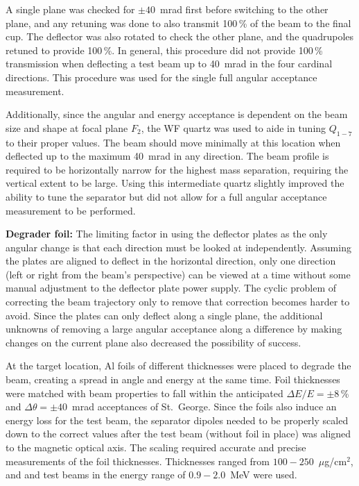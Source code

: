 A single plane was checked for $\pm 40$~mrad first before switching to
the other plane, and any retuning was done to also transmit 100\,\% of
the beam to the final cup. The deflector was also rotated to check the
other plane, and the quadrupoles retuned to provide 100\,\%. In general,
this procedure did not provide 100\,\% transmission when deflecting a
test beam up to 40~mrad in the four cardinal directions. This procedure
was used for the single full angular acceptance measurement.

Additionally, since the angular and energy acceptance is dependent on
the beam size and shape at focal plane $F_2$, the WF quartz was used to
aide in tuning $Q_{1-7}$ to their proper values. The beam should move
minimally at this location when deflected up to the maximum 40~mrad in
any direction. The beam profile is required to be horizontally narrow
for the highest mass separation, requiring the vertical extent to be
large. Using this intermediate quartz slightly improved the ability to
tune the separator but did not allow for a full angular acceptance
measurement to be performed.

\textbf{Degrader foil:}
The limiting factor in using the deflector plates as the only angular
change is that each direction must be looked at independently. Assuming
the plates are aligned to deflect in the horizontal direction, only one
direction (left or right from the beam's perspective) can be viewed at a
time without some manual adjustment to the deflector plate power supply.
The cyclic problem of correcting the beam trajectory only to remove that
correction becomes harder to avoid. Since the plates can only deflect
along a single plane, the additional unknowns of removing a large
angular acceptance along a difference by making changes on the current
plane also decreased the possibility of success.

At the target location, Al foils of different thicknesses were placed to
degrade the beam, creating a spread in angle and energy at the same
time. Foil thicknesses were matched with beam properties to fall within
the anticipated $\Delta E/E = \pm 8$\,\% and $\Delta\theta = \pm
40$~mrad acceptances of St.\ George. Since the foils also induce an
energy loss for the test beam, the separator dipoles needed to be
properly scaled down to the correct values after the test beam (without
foil in place) was aligned to the magnetic optical axis. The scaling
required accurate and precise measurements of the foil thicknesses.
Thicknesses ranged from $100-250$~$\mu$g/cm$^2$, and  and
 test beams in the energy range of $0.9-2.0$~MeV were used.

